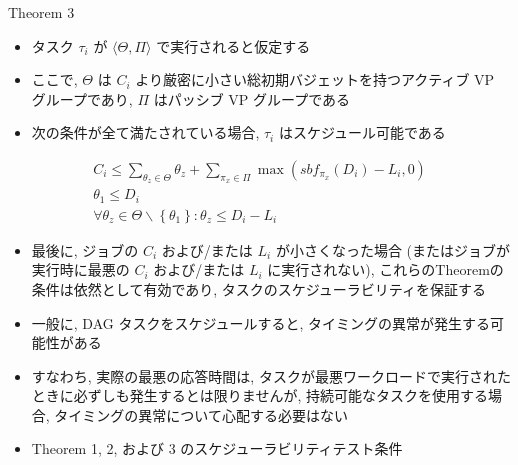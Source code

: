 \begin{frame}[label=theorem3]{Theorem 3}
    \begin{theorem}[]
        \begin{itemize}
            \item タスク $\tau_{i}$ が $\langle\Theta, \Pi\rangle$ で実行されると仮定する
            \item ここで, $\Theta$ は $C_{i}$ より厳密に小さい総初期バジェットを持つアクティブ VP グループであり, $\Pi$ はパッシブ VP グループである
            \item 次の条件が全て満たされている場合, $\tau_{i}$ はスケジュール可能である
        \end{itemize}
        \begin{equation*}
            \begin{gathered}
                C_{i} \leq \sum_{\theta_{z} \in \Theta} \theta_{z}+\sum_{\pi_{x} \in \Pi} \max \left(s b f_{\pi_{x}}\left(D_{i}\right)-L_{i}, 0\right) \\
                \theta_{1} \leq D_{i} \\
                \forall \theta_{z} \in \Theta \backslash\left\{\theta_{1}\right\}: \theta_{z} \leq D_{i}-L_{i}
            \end{gathered}
        \end{equation*}
    \end{theorem}
\end{frame}

\begin{frame}{}
    \begin{itemize}
        \item 最後に, ジョブの $C_{i}$ および/または $L_{i}$ が小さくなった場合 (またはジョブが実行時に最悪の $C_{i}$ および/または $L_{i}$ に実行されない), これらのTheoremの条件は依然として有効であり, タスクのスケジューラビリティを保証する
        \item 一般に, DAG タスクをスケジュールすると, タイミングの異常が発生する可能性がある
        \item すなわち, 実際の最悪の応答時間は, タスクが最悪ワークロードで実行されたときに必ずしも発生するとは限りませんが, 持続可能なタスクを使用する場合, タイミングの異常について心配する必要はない
        \item Theorem 1, 2, および 3 のスケジューラビリティテスト条件
    \end{itemize}
\end{frame}

